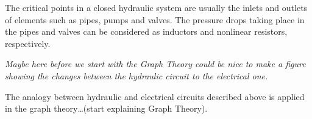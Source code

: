 The critical points in a closed hydraulic system are usually the inlets and outlets of elements such as pipes, pumps and valves. 
The pressure drops taking place in the pipes and valves can be considered as inductors and nonlinear resistors, respectively. 

\textit{Maybe here before we start with the Graph Theory could be nice to make a figure showing the changes between the hydraulic circuit to the electrical 
one.}

The analogy between hydraulic and electrical circuits described above is applied in the graph theory…(start explaining Graph Theory).






